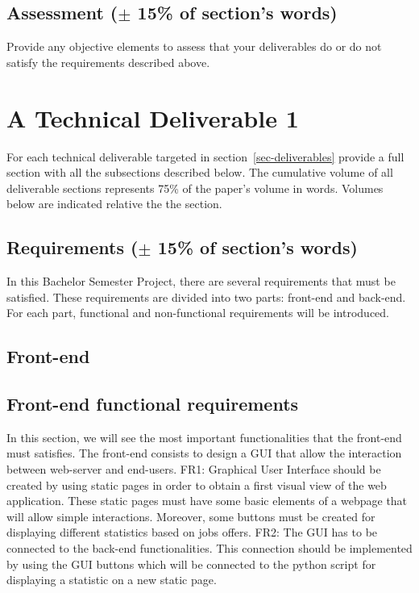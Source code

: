 \documentclass[conference,compsoc]{IEEEtran}
\begin{document}
\subsection{Assessment ($\pm$ 15\% of section's words)}
Provide any objective elements to assess that your deliverables do or do not satisfy the requirements described above. 

\section{ A Technical Deliverable 1}
For each technical deliverable targeted in section~\ref{sec-deliverables} provide a full section with all the subsections described below.
The cumulative volume of all deliverable sections represents 75\% of the paper's volume in words. Volumes below are indicated relative the the section.
\label{sec-production}
\subsection{Requirements ($\pm$ 15\% of section's words)}
In this Bachelor Semester Project, there are several requirements that must be satisfied. These requirements are divided into two parts: front-end and back-end. For each part, functional and non-functional requirements will be introduced. 

\subsection{Front-end}
\subsection{Front-end functional requirements}
In this section, we will see the most important functionalities that the front-end must satisfies. The front-end consists to design a GUI that allow the interaction between web-server and end-users. 
\newline\newline
FR1: Graphical User Interface should be created by using static pages in order to obtain a first visual view of the web application. These static pages must have some basic elements of a webpage that will allow simple interactions. Moreover, some buttons must be created for displaying different statistics based on jobs offers. 
\newline\newline 
FR2: The GUI has to be connected to the back-end functionalities. This connection should be implemented by using the GUI buttons which will be connected to the python script for displaying a statistic on a new static page. 
\end{document}
